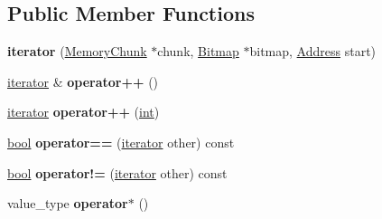\subsection*{Public Member Functions}
\begin{DoxyCompactItemize}
\item 
\mbox{\label{classv8_1_1internal_1_1LiveObjectRange_1_1iterator_a02293954da53e80cdac15944657a9f02}} 
{\bfseries iterator} (\mbox{\hyperlink{classv8_1_1internal_1_1MemoryChunk}{Memory\+Chunk}} $\ast$chunk, \mbox{\hyperlink{classv8_1_1internal_1_1Bitmap}{Bitmap}} $\ast$bitmap, \mbox{\hyperlink{classuintptr__t}{Address}} start)
\item 
\mbox{\label{classv8_1_1internal_1_1LiveObjectRange_1_1iterator_aebadab5b81cfd3ecd582e18df9e3b11d}} 
\mbox{\hyperlink{classv8_1_1internal_1_1LiveObjectRange_1_1iterator}{iterator}} \& {\bfseries operator++} ()
\item 
\mbox{\label{classv8_1_1internal_1_1LiveObjectRange_1_1iterator_aace45038f5b560867b4419384825517a}} 
\mbox{\hyperlink{classv8_1_1internal_1_1LiveObjectRange_1_1iterator}{iterator}} {\bfseries operator++} (\mbox{\hyperlink{classint}{int}})
\item 
\mbox{\label{classv8_1_1internal_1_1LiveObjectRange_1_1iterator_a11d84d9019c9d4e731d43cbe45e44314}} 
\mbox{\hyperlink{classbool}{bool}} {\bfseries operator==} (\mbox{\hyperlink{classv8_1_1internal_1_1LiveObjectRange_1_1iterator}{iterator}} other) const
\item 
\mbox{\label{classv8_1_1internal_1_1LiveObjectRange_1_1iterator_a7dd69f4f43aeb2d93c20fbea9c596afe}} 
\mbox{\hyperlink{classbool}{bool}} {\bfseries operator!=} (\mbox{\hyperlink{classv8_1_1internal_1_1LiveObjectRange_1_1iterator}{iterator}} other) const
\item 
\mbox{\label{classv8_1_1internal_1_1LiveObjectRange_1_1iterator_a8a679413bcad92cbc448edde7cb21d45}} 
value\+\_\+type {\bfseries operator$\ast$} ()
\end{DoxyCompactItemize}


